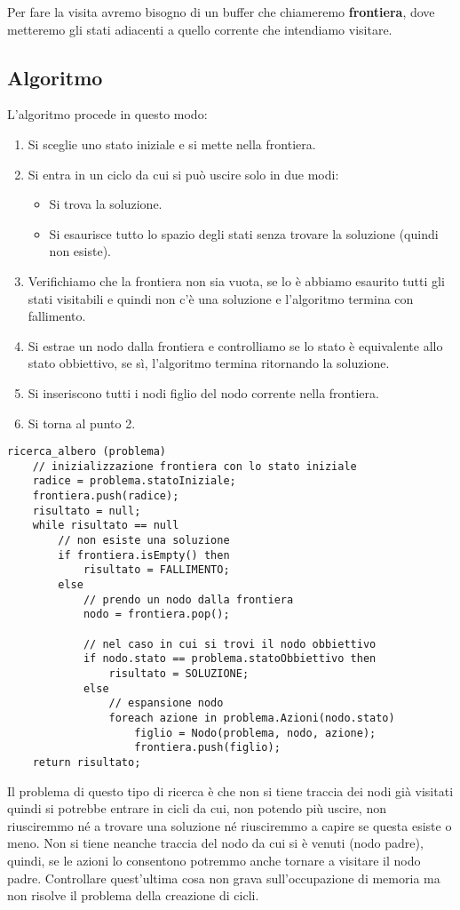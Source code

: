 Per fare la visita avremo bisogno di un buffer che chiameremo \textbf{frontiera}, dove metteremo
gli stati adiacenti a quello corrente che intendiamo visitare.

\subsection{Algoritmo}
L'algoritmo procede in questo modo:
\begin{enumerate}
	\item Si sceglie uno stato iniziale e si mette nella frontiera.
	\item Si entra in un ciclo da cui si pu\`o uscire solo in due modi:
	      \begin{itemize}
		      \item Si trova la soluzione.
		      \item Si esaurisce tutto lo spazio degli stati senza trovare la soluzione (quindi
		            non esiste).
	      \end{itemize}
	\item Verifichiamo che la frontiera non sia vuota, se lo \`e abbiamo esaurito tutti gli
	      stati visitabili e quindi non c'\`e una soluzione e l'algoritmo termina con
	      fallimento.
	\item Si estrae un nodo dalla frontiera e controlliamo se lo stato \`e equivalente allo
	      stato obbiettivo, se s\`i, l'algoritmo termina ritornando la soluzione.
	\item Si inseriscono tutti i nodi figlio del nodo corrente nella frontiera.
	\item Si torna al punto 2.
\end{enumerate}
\begin{lstlisting}[style=pseudo-style]
ricerca_albero (problema)
	// inizializzazione frontiera con lo stato iniziale
	radice = problema.statoIniziale;
	frontiera.push(radice);
	risultato = null;
	while risultato == null
		// non esiste una soluzione
		if frontiera.isEmpty() then
			risultato = FALLIMENTO;
		else
			// prendo un nodo dalla frontiera
			nodo = frontiera.pop();
		
			// nel caso in cui si trovi il nodo obbiettivo
			if nodo.stato == problema.statoObbiettivo then
				risultato = SOLUZIONE;
			else
				// espansione nodo
				foreach azione in problema.Azioni(nodo.stato)
					figlio = Nodo(problema, nodo, azione);
					frontiera.push(figlio);
	return risultato;
\end{lstlisting}
Il problema di questo tipo di ricerca \`e che non si tiene traccia dei nodi gi\`a visitati
quindi si potrebbe entrare in cicli da cui, non potendo pi\`u uscire, non riusciremmo n\'e
a trovare una soluzione n\'e riusciremmo a capire se questa esiste o meno. Non si tiene neanche
traccia del nodo da cui si \`e venuti (nodo padre), quindi, se le azioni lo consentono potremmo
anche tornare a visitare il nodo padre. Controllare quest'ultima cosa non grava sull'occupazione
di memoria ma non risolve il problema della creazione di cicli.

